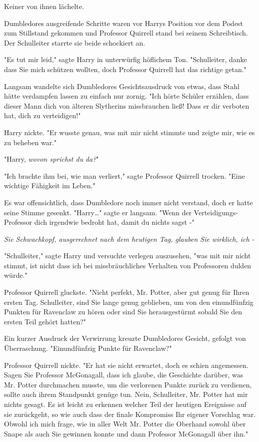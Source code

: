 {Keiner von ihnen lächelte.

Dumbledores ausgreifende Schritte waren vor Harrys Position vor dem Podest zum Stillstand gekommen und Professor Quirrell stand bei seinem Schreibtisch. Der Schulleiter starrte sie beide schockiert an.

"Es tut mir leid," sagte Harry in unterwürfig höflichem Ton. "Schulleiter, danke dass Sie mich schützen wollten, doch Professor Quirrell hat das richtige getan."

Langsam wandelte sich Dumbledores Gesichtsausdruck von etwas, dass Stahl hätte verdampfen lassen zu einfach nur zornig. "Ich hörte Schüler erzählen, dass dieser Mann dich von älteren Slytherins missbrauchen ließ! Dass er dir verboten hat, dich zu verteidigen!"

Harry nickte. "Er wusste genau, was mit mir nicht stimmte und zeigte mir, wie es zu beheben war."

"Harry, \emph{wovon sprichst du} \emph{da?}"

"Ich brachte ihm bei, wie man verliert," sagte Professor Quirrell trocken. "Eine wichtige Fähigkeit im Leben."

Es war offensichtlich, dass Dumbledore noch immer nicht verstand, doch er hatte seine Stimme gesenkt. "Harry…" sagte er langsam. "Wenn der Verteidigungs-Professor dich irgendwie bedroht hat, damit du nichts sagst -"

\emph{Sie Schwachkopf, ausgerechnet nach dem heutigen Tag, glauben Sie wirklich, ich -}

"Schulleiter," sagte Harry und versuchte verlegen auszusehen, "was mit mir nicht stimmt, ist nicht dass ich bei missbräuchliches Verhalten von Professoren dulden würde."

Professor Quirrell gluckste. "Nicht perfekt, Mr. Potter, aber gut genug für Ihren ersten Tag. Schulleiter, sind Sie lange genug geblieben, um von den einundfünfzig Punkten für Ravenclaw zu hören oder sind Sie herausgestürmt sobald Sie den ersten Teil gehört hatten?"

Ein kurzer Ausdruck der Verwirrung kreuzte Dumbledores Gesicht, gefolgt von Überraschung. "Einundfünfzig Punkte für Ravenclaw?"

Professor Quirrell nickte. "Er hat sie nicht erwartet, doch es schien angemessen. Sagen Sie Professor McGonagall, dass ich glaube, die Geschichte darüber, was Mr. Potter durchmachen musste, um die verlorenen Punkte zurück zu verdienen, sollte auch ihrem Standpunkt genüge tun. Nein, Schulleiter, Mr. Potter hat mir nichts gesagt. Es ist leicht zu erkennen welcher Teil der heutigen Ereignisse auf sie zurückgeht, so wie auch dass der finale Kompromiss Ihr eigener Vorschlag war. Obwohl ich mich frage, wie in aller Welt Mr. Potter die Oberhand sowohl über Snape als auch Sie gewinnen konnte und dann Professor McGonagall über ihn."

}

